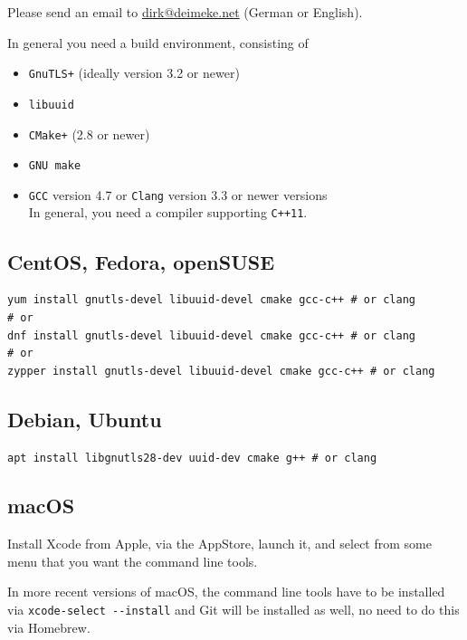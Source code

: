 \documentclass[DIV=12,fontsize=12pt,parskip=half,paper=portrait,%
               headheight=61pt,headinclude=yes,%
               footheight=15pt,footinclude=no]{scrartcl}
\begin{document}
Please send an email to \href{mailto:dirk@deimeke.net}{dirk@deimeke.net} (German or English).

In general you need a build environment, consisting of
\begin{itemize}
    \item \texttt{GnuTLS+} (ideally version 3.2 or newer)
    \item \texttt{libuuid}
    \item \texttt{CMake+} (2.8 or newer)
    \item \texttt{GNU make}
    \item \texttt{GCC} version 4.7 or \texttt{Clang} version 3.3 or newer versions \\
        {\small In general, you need a compiler supporting \texttt{C++11}.}
\end{itemize}

\subsection{CentOS, Fedora, openSUSE}

\begin{lstlisting}
yum install gnutls-devel libuuid-devel cmake gcc-c++ # or clang
# or
dnf install gnutls-devel libuuid-devel cmake gcc-c++ # or clang
# or
zypper install gnutls-devel libuuid-devel cmake gcc-c++ # or clang\end{lstlisting}

\subsection{Debian, Ubuntu}

\begin{lstlisting}
apt install libgnutls28-dev uuid-dev cmake g++ # or clang\end{lstlisting}

\subsection{macOS}

Install Xcode from Apple, via the AppStore, launch it, and select from some menu that you want the command line tools.

In more recent versions of macOS, the command line tools have to be installed via \verb=xcode-select --install= and Git will be installed as well, no need to do this via Homebrew.
\end{document}
